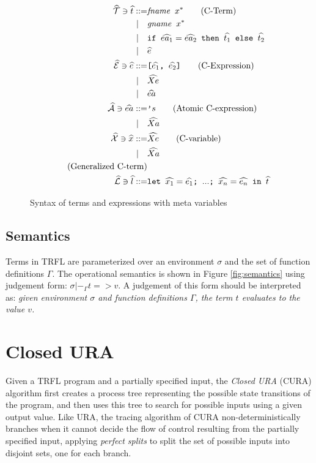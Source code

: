 \documentclass[10pt]{../sigplanconf}
\begin{document}
\begin{figure}\centering
  \begin{align*}
    \widehat{\mathcal{T}} \ni \widehat{t}
      ::=& \texttt{\textit{\rmfamily fname} $x^{*}$} \tag{C-Term} \\
    | \quad & \texttt{\textit{\rmfamily gname} $x^{*}$} \\
    | \quad & \texttt{if $\widehat{ea_1} = \widehat{ea_2}$ then $\widehat{t_1}$ else $\widehat{t_2}$} \\
    | \quad & \widehat{e} \\
    \widehat{\mathcal{E}} \ni \widehat{e} ::=& \texttt{[$\widehat{e_1}$, $\widehat{e_2}$]} \tag{C-Expression} \\
    | \quad & \widehat{Xe} \\
    | \quad & \widehat{ea} \\
    \widehat{\mathcal{A}} \ni \widehat{ea} ::= & \texttt{'}s \tag{Atomic C-expression} \\
    | \quad & \widehat{Xa} \\
    \widehat{\mathcal{X}} \ni \widehat{x} ::= & \widehat{Xe} \tag{C-variable} \\
    | \quad & \widehat{Xa} \\
    \tag{Generalized C-term} \\
    \widehat{\mathcal{L}} \ni \widehat{l} ::= & \texttt{let $\widehat{x_1} = \widehat{e_1}$; $...$; $\widehat{x_n} = \widehat{e_n}$ in $\widehat{t}$}
  \end{align*}

\caption{Syntax of terms and expressions with meta variables}
\label{fig:cbnf}
\end{figure}

\subsection{Semantics}
Terms in TRFL are parameterized over an environment $\sigma$ and
the set of function definitions $\Gamma$. The operational semantics is
shown in Figure \ref{fig:semantics} using judgement form: $\sigma
|-_\Gamma t => v$. A judgement of this form should be interpreted as:
\textit{given environment $\sigma$ and function definitions $\Gamma$,
  the term $t$ evaluates to the value $v$.}

\section{Closed URA}
\label{sec:closed-ura}
Given a TRFL program and a partially specified input, the \emph{Closed
  URA} (CURA) algorithm first creates a process tree representing the
possible state transitions of the program, and then uses this tree to
search for possible inputs using a given output value. Like URA, the
tracing algorithm of CURA non-deterministically branches when it
cannot decide the flow of control resulting from the partially
specified input, applying \emph{perfect splits} to split the set of
possible inputs into disjoint sets, one for each branch.
\end{document}
